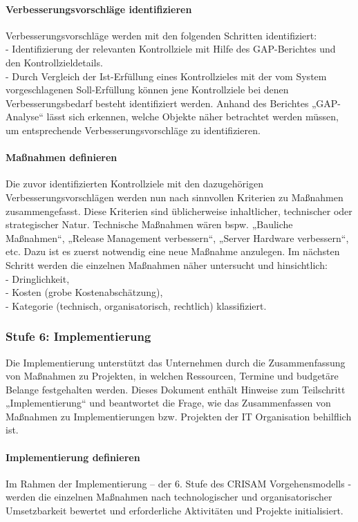 \paragraph{Verbesserungsvorschläge identifizieren}
Verbesserungsvorschläge werden mit den folgenden Schritten identifiziert:\\
- Identifizierung der relevanten Kontrollziele mit Hilfe des GAP-Berichtes und den Kontrollzieldetails.
\\- Durch Vergleich der Ist-Erfüllung eines Kontrollzieles mit der vom System vorgeschlagenen Soll-Erfüllung können jene Kontrollziele bei denen Verbesserungsbedarf besteht identifiziert werden.
Anhand des Berichtes „GAP-Analyse“ lässt sich erkennen, welche Objekte näher betrachtet werden müssen, um entsprechende Verbesserungsvorschläge zu identifizieren.
\paragraph{Maßnahmen definieren}
Die zuvor identifizierten Kontrollziele mit den dazugehörigen Verbesserungsvorschlägen werden nun nach sinnvollen Kriterien zu Maßnahmen zusammengefasst. Diese Kriterien sind üblicherweise inhaltlicher, technischer oder strategischer Natur. Technische Maßnahmen wären bspw. „Bauliche Maßnahmen“, „Release Management verbessern“, „Server Hardware verbessern“, etc.
Dazu ist es zuerst notwendig eine neue Maßnahme anzulegen. Im nächsten Schritt werden die einzelnen Maßnahmen näher untersucht und hinsichtlich:\\
- Dringlichkeit,\\
- Kosten (grobe Kostenabschätzung),\\
- Kategorie (technisch, organisatorisch, rechtlich)
klassifiziert.
\subsubsection{Stufe 6: Implementierung}
Die Implementierung unterstützt das Unternehmen durch die Zusammenfassung von Maßnahmen zu Projekten, in welchen Ressourcen, Termine und budgetäre Belange festgehalten werden.
Dieses Dokument enthält Hinweise zum Teilschritt „Implementierung“ und beantwortet die Frage, wie das Zusammenfassen von Maßnahmen zu Implementierungen bzw. Projekten der IT Organisation behilflich ist.
\paragraph{Implementierung definieren}
Im Rahmen der Implementierung – der 6. Stufe des CRISAM Vorgehensmodells - werden die einzelnen Maßnahmen nach technologischer und organisatorischer Umsetzbarkeit bewertet und erforderliche Aktivitäten und Projekte initialisiert.
